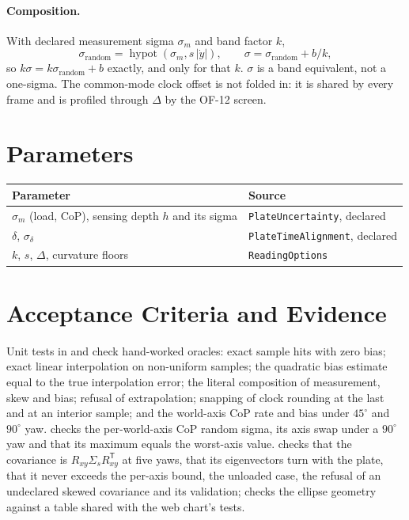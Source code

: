 \documentclass[11pt]{article}
\begin{document}
\paragraph{Composition.} With declared measurement sigma $\sigma_m$ and
band factor $k$,
\begin{equation}
  \sigma_{\mathrm{random}} = \operatorname{hypot}(\sigma_m, s\,|\dot y|),
  \qquad
  \sigma = \sigma_{\mathrm{random}} + b/k,
\end{equation}
so $k\sigma = k\sigma_{\mathrm{random}} + b$ exactly, and only for that
$k$. $\sigma$ is a band equivalent, not a one-sigma. The common-mode clock
offset is not folded in: it is shared by every frame and is profiled
through $\Delta$ by the OF-12 screen.

\section{Parameters}

\begin{tabular}{@{}ll@{}}
\toprule
Parameter & Source \\
\midrule
$\sigma_m$ (load, CoP), sensing depth $h$ and its sigma & \texttt{PlateUncertainty}, declared \\
$\delta$, $\sigma_\delta$ & \texttt{PlateTimeAlignment}, declared \\
$k$, $s$, $\Delta$, curvature floors & \texttt{ReadingOptions} \\
\bottomrule
\end{tabular}

\section{Acceptance Criteria and Evidence}

Unit tests in  and
 check hand-worked oracles: exact sample hits
with zero bias; exact linear interpolation on non-uniform samples; the
quadratic bias estimate equal to the true interpolation error; the literal
composition of measurement, skew and bias; refusal of extrapolation;
snapping of clock rounding at the last and at an interior sample; and the
world-axis CoP rate and bias under $45^\circ$ and $90^\circ$ yaw.
 checks the per-world-axis CoP random sigma,
its axis swap under a $90^\circ$ yaw and that its maximum equals the
worst-axis value.  checks that the
covariance is $R_{xy}\Sigma_sR_{xy}^{\mathsf T}$ at five yaws, that its
eigenvectors turn with the plate, that it never exceeds the per-axis bound,
the unloaded case, the refusal of an undeclared skewed covariance and its
validation;
 checks the
ellipse geometry against a table shared with the web chart's tests.
\end{document}
